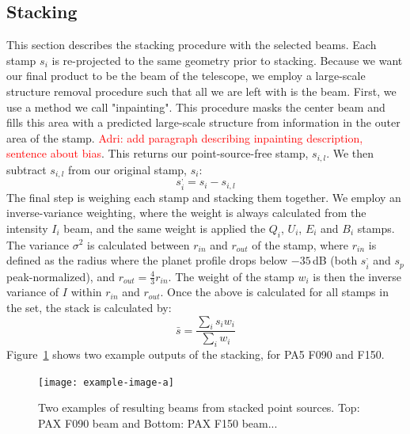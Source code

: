 \subsection{Stacking}
\label{subsec:stacking}
This section describes the stacking procedure with the selected beams.  Each stamp $s_i$ is re-projected to the same geometry prior to stacking.  Because we want our final product to be the beam of the telescope, we employ a large-scale structure removal procedure such that all we are left with is the beam.  First, we use a method we call "inpainting".  This procedure masks the center beam and fills this area with a predicted large-scale structure from information in the outer area of the stamp.  \textcolor{red}{Adri: add paragraph describing inpainting description, sentence about bias}. This returns our point-source-free stamp, $s_{i,l}$.  We then subtract $s_{i,l}$ from our original stamp, $s_i$:
\begin{equation}
    s_i^{,} = s_i - s_{i,l}
\end{equation}
The final step is weighing each stamp and stacking them together.  We employ an inverse-variance weighting, where the weight is always calculated from the intensity $I_i$ beam, and the same weight is applied the $Q_i$, $U_i$, $E_i$ and $B_i$ stamps.  The variance $\sigma^2$ is calculated between $r_{in}$ and $r_{out}$ of the stamp, where $r_{in}$ is defined as the radius where the planet profile drops below $-35$\,dB (both $s_i^{,}$ and $s_p$ peak-normalized), and $r_{out}=\frac{4}{3}r_{in}$.  The weight of the stamp $w_i$ is then the inverse variance of $I$ within $r_{in}$ and $r_{out}$.  Once the above is calculated for all stamps in the set, the stack is calculated by:
\begin{equation}
    \bar{s} = \frac{\sum_i s_i w_i }{\sum_i w_i}
\end{equation}
Figure~\ref{fig:example_maps} shows two example outputs of the stacking, for PA5 F090 and F150.  
\begin{figure}
    \centering
    \texttt{[image: example-image-a]}
    \caption{Two examples of resulting beams from stacked point sources.  Top: PAX F090 beam and Bottom: PAX F150 beam...}
    \label{fig:example_maps}
    \vspace{1em}
\end{figure}

